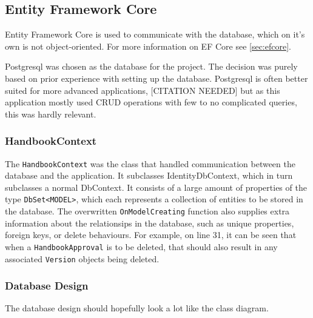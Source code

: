 \subsection{Entity Framework Core}
Entity Framework Core is used to communicate with the database, which on it's own is not object-oriented.
For more information on EF Core see \cref{sec:efcore}.

Postgresql was chosen as the database for the project.
The decision was purely based on prior experience with setting up the database.
Postgresql is often better suited for more advanced applications, [CITATION NEEDED] but as this application mostly used CRUD operations with few to no complicated queries, this was hardly relevant.
\subsubsection{HandbookContext}
The \texttt{HandbookContext} was the class that handled communication between the database and the application.
It subclasses IdentityDbContext, which in turn subclasses a normal DbContext.
It consists of a large amount of properties of the type \texttt{DbSet<MODEL>}, which each represents a collection of entities to be stored in the database. The overwritten \texttt{OnModelCreating} function also supplies extra information about the relationsips in the database, such as unique properties, foreign keys, or delete behaviours. For example, on line 31, it can be seen that when a \texttt{HandbookApproval} is to be deleted, that should also result in any associated \texttt{Version} objects being deleted.


\subsubsection{Database Design}
The database design should hopefully look a lot like the class diagram.
